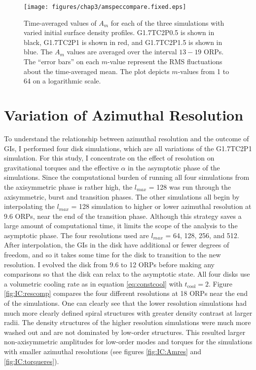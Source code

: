 \begin{figure}[p]
\centering
\texttt{[image: figures/chap3/amspeccompare.fixed.eps]}
\caption[$\left<A_m\right>$ values for the comparison of initial surface density profiles]{Time-averaged values of $A_m$ for each of the three simulations with varied initial surface density profiles. G1.7TC2P0.5 is shown in black, G1.7TC2P1 is shown in red, and G1.7TC2P1.5 is shown in blue. The $A_m$ values are averaged over the interval $13 -19$ ORPs. The ``error bars'' on each $m$-value represent the RMS fluctuations about the time-averaged mean. The plot depicts $m$-values from 1 to 64 on a logarithmic scale.}
\label{fig:IC:Am}
\end{figure}

\section{Variation of Azimuthal Resolution}\label{sec:IC:resolution}

To understand the relationship between azimuthal resolution and the outcome of GIs, I performed four disk simulations, which are all variations of the G1.7TC2P1 simulation. For this study, I concentrate on the effect of resolution on gravitational torques and the effective $\alpha$ in the asymptotic phase of the simulations. Since the computational burden of running all four simulations from the axisymmetric phase is rather high, the $l_{max}$ = 128 was run through the axisymmetric, burst and transition phases. The other simulations all begin by interpolating the $l_{max}$ = 128 simulation to higher or lower azimuthal resolution at 9.6 ORPs, near the end of the transition phase. Although this strategy saves a large amount of computational time, it limits the scope of the analysis to the asymptotic phase. The four resolutions used are $l_{max}$ = 64, 128, 256, and 512. After interpolation, the GIs in the disk have additional or fewer degrees of freedom, and so it takes some time for the disk to transition to the new resolution. I evolved the disk from 9.6 to 12 ORPs before making any comparisons so that the disk can relax to the asymptotic state. All four disks use a volumetric cooling rate as in equation \eqref{eq:constcool} with $t_\mathrm{cool} = 2$. Figure \ref{fig:IC:rescomp} compares the four different resolutions at 18 ORPs near the end of the simulations. One can clearly see that the lower resolution simulations had much more clearly defined spiral structures with greater density contrast at larger radii. The density structures of the higher resolution simulations were much more washed out and are not dominated by low-order structures. This resulted larger non-axisymmetric amplitudes for low-order modes and torques for the simulations with smaller azimuthal resolutions (see figures \ref{fig:IC:Amres} and \ref{fig:IC:torqueres}).

